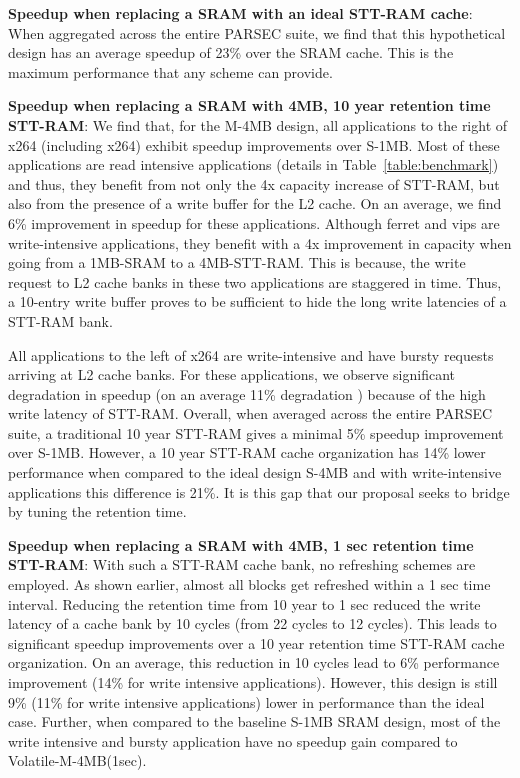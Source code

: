 {\bf Speedup when replacing a SRAM with an ideal STT-RAM cache}: When aggregated across the entire PARSEC suite, we find that this hypothetical design has an average speedup of 23\% over the SRAM cache. This is the maximum performance that any scheme can provide.

{\bf Speedup when replacing a SRAM with 4MB, 10 year retention time STT-RAM}: We find that, for the M-4MB design, all applications to the right of x264 (including x264) exhibit speedup improvements over S-1MB. Most of these applications are read intensive applications (details in Table~\ref{table:benchmark}) and thus, they benefit from not only the 4x capacity increase of STT-RAM, but also from the presence of a write buffer for the L2 cache. On an average, we find 6\% improvement in speedup for these applications. Although ferret and vips are write-intensive applications, they benefit with a 4x improvement in capacity when going from a 1MB-SRAM to a 4MB-STT-RAM. This is because, the write request to L2 cache banks in these two applications are staggered in time. Thus, a 10-entry write buffer proves to be sufficient to hide the long write latencies of a STT-RAM bank.

All applications to the left of x264 are write-intensive and have bursty requests arriving at L2 cache banks. For these applications, we observe significant degradation in speedup (on an average 11\% degradation ) because of the high write latency of STT-RAM.
Overall, when averaged across the entire PARSEC suite, a traditional 10 year STT-RAM gives a minimal 5\% speedup improvement over S-1MB. However, a 10 year STT-RAM cache organization has 14\% lower performance when compared to the ideal design S-4MB and with write-intensive applications this difference is 21\%. It is this gap that our proposal seeks to bridge by tuning the retention time.

{\bf Speedup when replacing a SRAM with 4MB, 1 sec retention time STT-RAM}: With such a STT-RAM cache bank, no refreshing schemes are employed. As shown earlier, almost all blocks get refreshed within a 1 sec time interval. Reducing the retention time from 10 year to 1 sec reduced the write latency of a cache bank by 10 cycles (from 22 cycles to 12 cycles). This leads to significant speedup improvements over a 10 year retention time STT-RAM cache organization. On an average, this reduction in 10 cycles lead to 6\% performance improvement (14\% for write intensive applications). However, this design is still 9\% (11\% for write intensive applications) lower in performance than the ideal case.
Further, when compared to the baseline S-1MB SRAM design, most of the write intensive and bursty application have no speedup gain compared to
Volatile-M-4MB(1sec).

